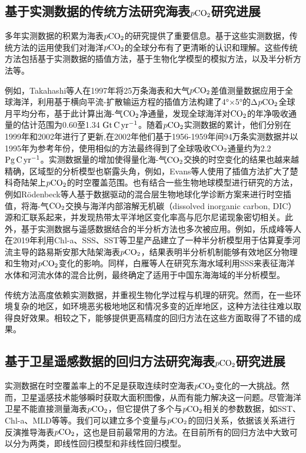 \subsection{基于实测数据的传统方法研究海表\texorpdfstring{$p\rm CO_2$}{}研究进展}
多年实测数据的积累为海表$p\rm CO_2$的研究提供了重要信息。基于这些实测数据，传统方法的运用使我们对海洋$p\rm CO_2$的全球分布有了更清晰的认识和理解。这些传统方法包括基于实测数据的插值方法\cite{takahashi1997global,takahashi1999net,takahashi2002global}，基于生物化学模型的模拟方法\cite{rodenbeck2014interannual}，以及半分析方法\cite{le2019estimating,bai2015mechanistic,chen2017estimating}等。

例如，Takahashi等人\cite{takahashi1997global}在1997年将25万条海表和大气$p\rm CO_2$差值测量数据应用于全球海洋，利用基于横向平流-扩散输运方程的插值方法构建了4°×5°的Δ$p\rm CO_2$全球月平均分布，基于此计算出海-气$\rm CO_2$净通量，发现全球海洋对$\rm CO_2$的年净吸收通量的估计范围为0.60至1.34 $\rm Gt \, C\, yr^{-1}$。随着$p\rm CO_2$实测数据的累计，他们分别在1999年\cite{takahashi1999net}和2002年\cite{takahashi2002global}进行了更新,在2002年\cite{takahashi2002global}他们基于1956-1959年间94万条实测数据并以1995年为参考年份，使用相似的方法最终得到了全球吸收$\rm CO_2$通量约为2.2$\rm Pg\, C\, yr^{-1}$。实测数据量的增加使得量化海-气$\rm CO_2$交换的时空变化的结果也越来越精确，区域型的分析模型也崭露头角，例如，Evans等人\cite{evans2015sea}使用了插值方法扩大了楚科奇陆架上$p\rm CO_2$的时空覆盖范围。也有结合一些生物地球模型进行研究的方法，例如Rödenbeck等人\cite{rodenbeck2014interannual}基于数据驱动的混合层生物地球化学诊断方案来进行时空插值，将海-气$\rm CO_2$交换与海洋内部溶解无机碳（dissolved inorganic carbon, DIC）源和汇联系起来，并发现热带太平洋地区变化率高与厄尔尼诺现象密切相关。此外，基于实测数据与遥感数据结合的半分析方法也多次被应用。例如，乐成峰等人\cite{le2019estimating}在2019年利用Chl-a、SSS、SST等卫星产品建立了一种半分析模型用于估算夏季河流主导的路易斯安那大陆架海表$p\rm CO_2$，结果表明半分析机制能够有效地区分物理和生物对$p\rm CO_2$变化的影响。同样，白雁等人\cite{bai2015mechanistic}在研究东海水域利用SSS来表征海洋水体和河流水体的混合比例，最终确定了适用于中国东海海域的半分析模型。

传统方法高度依赖实测数据，并重视生物化学过程与机理的研究。然而，在一些环境复杂的地区，如环境恶劣极地地区和情况多变的近岸地区，这种方法往往难以取得良好效果。相较之下，能够提供更高精度的回归方法在这些方面取得了不错的成果。

\subsection{基于卫星遥感数据的回归方法研究海表\texorpdfstring{$p\rm CO_2$}{}研究进展}
实测数据在时空覆盖率上的不足是获取连续时空海表$p\rm CO_2$变化的一大挑战。然而，卫星遥感技术能够瞬时获取大面积图像，从而有能力解决这一问题。尽管海洋卫星不能直接测量海表$p\rm CO_2$，但它提供了多个与$p\rm CO_2$相关的参数数据，如SST、Chl-a、MLD等等。我们可以建立多个变量与$p\rm CO_2$的回归关系，依据该关系进行反演推导海表$p\rm CO_2$，这也是目前最常用的方法。在目前所有的回归方法中大致可以分为两类，即线性回归模型和非线性回归模型。

